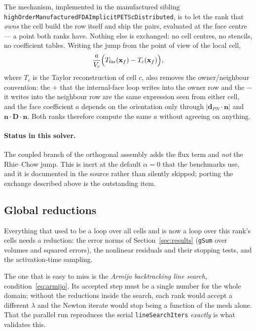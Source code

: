\documentclass[11pt,a4paper]{article}
\newcommand{\code}[1]{\texttt{\small #1}}
\newcommand{\Dten}{\mathbf{D}}
\begin{document}
The mechanism, implemented in the manufactured sibling
\code{highOrderManufacturedFDAImplicitPETScDistributed}, is to let the rank that
\emph{owns} the cell build the row itself and ship the pairs, evaluated at the
face centre --- a point both ranks have. Nothing else is exchanged: no cell
centres, no stencils, no coefficient tables. Writing the jump from the point of
view of the local cell,
\[
   \frac{a}{V_{c}}\Bigl( T_{\text{far}}(\mathbf{x}_{f})
                        - T_{c}(\mathbf{x}_{f}) \Bigr),
\]
where $T_{c}$ is the Taylor reconstruction of cell $c$, also removes the
owner/neighbour convention: the $+$ that the internal-face loop writes into the
owner row and the $-$ it writes into the neighbour row are the same expression
seen from either cell, and the face coefficient $a$ depends on the orientation
only through $|\mathbf{d}_{PN}\!\cdot\!\mathbf{n}|$ and
$\mathbf{n}\!\cdot\!\Dten\!\cdot\!\mathbf{n}$. Both ranks therefore compute the
same $a$ without agreeing on anything.

\paragraph{Status in this solver.} The coupled branch of the orthogonal assembly
adds the flux term and \emph{not} the Rhie--Chow jump. This is inert at the
default $\alpha=0$ that the benchmarks use, and it is documented in the source
rather than silently skipped; porting the exchange described above is the
outstanding item.

\subsection{Global reductions}

Everything that used to be a loop over all cells and is now a loop over this
rank's cells needs a reduction: the error norms of
Section~\ref{sec:results} (\code{gSum} over volumes and squared errors), the
nonlinear residuals and their stopping tests, and the activation-time sampling.

The one that is easy to miss is the \emph{Armijo backtracking line search},
condition~\eqref{eq:armijo}. Its accepted step must be a single number for the
whole domain; without the reductions inside the search, each rank would accept a
different $\lambda$ and the Newton iterate would stop being a function of the
mesh alone. That the parallel run reproduces the serial \code{lineSearchIters}
\emph{exactly} is what validates this.
\end{document}
